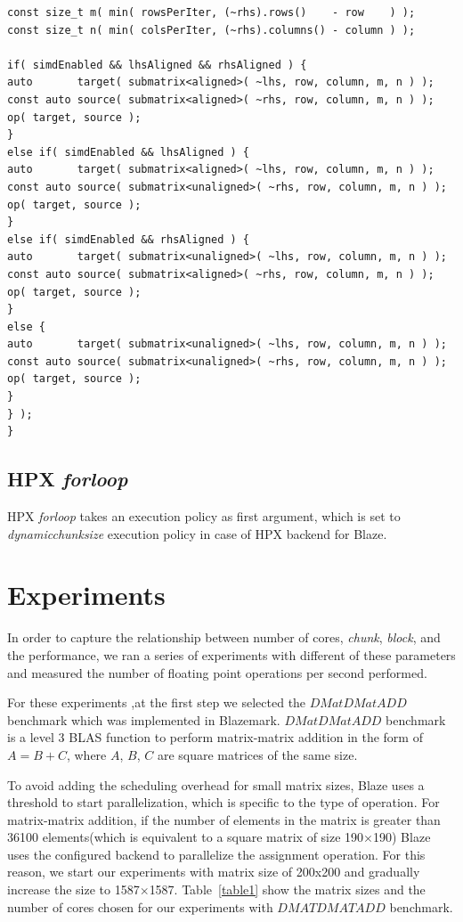 \begin{lstlisting}[float,floatplacement=H,caption= {New implementation of Assign function for HPX backend in Blaze.}, label={new_hpx_backend}]
const size_t m( min( rowsPerIter, (~rhs).rows()    - row    ) );
const size_t n( min( colsPerIter, (~rhs).columns() - column ) );

if( simdEnabled && lhsAligned && rhsAligned ) {
auto       target( submatrix<aligned>( ~lhs, row, column, m, n ) );
const auto source( submatrix<aligned>( ~rhs, row, column, m, n ) );
op( target, source );
}
else if( simdEnabled && lhsAligned ) {
auto       target( submatrix<aligned>( ~lhs, row, column, m, n ) );
const auto source( submatrix<unaligned>( ~rhs, row, column, m, n ) );
op( target, source );
}
else if( simdEnabled && rhsAligned ) {
auto       target( submatrix<unaligned>( ~lhs, row, column, m, n ) );
const auto source( submatrix<aligned>( ~rhs, row, column, m, n ) );
op( target, source );
}
else {
auto       target( submatrix<unaligned>( ~lhs, row, column, m, n ) );
const auto source( submatrix<unaligned>( ~rhs, row, column, m, n ) );
op( target, source );
}
} );
}
\end{lstlisting}
\vspace{\baselineskip}	
\subsection{HPX \textit{for\textunderscore loop}}
HPX \textit{for\textunderscore loop} takes an execution policy as first argument, which is set to \textit{dynamic\textunderscore chunk\textunderscore size} execution policy in case of HPX backend for Blaze.

\vspace{\baselineskip}	
\section{Experiments}
In order to capture the relationship between number of cores, \textit{chunk}, \textit{block}, and the performance, we ran a series of experiments with different of these parameters and measured the number of floating point operations per second performed. 

For these experiments ,at the first step we selected the $DMatDMatADD$ benchmark which was implemented in Blazemark. $DMatDMatADD$ benchmark is a level 3 BLAS function to perform matrix-matrix addition in the form of $A=B+C$, where $A$, $B$, $C$ are square matrices of the same size. 

To avoid adding the scheduling overhead for small matrix sizes, Blaze uses a threshold to start parallelization, which is specific to the type of operation. For matrix-matrix addition, if the number of elements in the matrix is greater than 36100 elements(which is equivalent to a square matrix of size 190$\times$190) Blaze uses the configured backend to parallelize the assignment operation. For this reason, we start our experiments with matrix size of 200x200 and gradually increase the size to 1587$\times$1587. 
Table~\ref{table1} show the matrix sizes and the number of cores chosen for our experiments with $DMATDMATADD$ benchmark.

